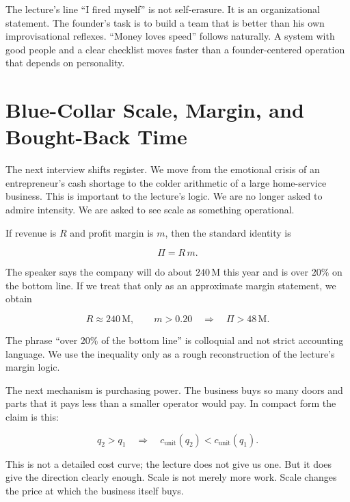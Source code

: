 The lecture's line ``I fired myself'' is not self-erasure. It is an organizational statement. The founder's task is to build a team that is better than his own improvisational reflexes. ``Money loves speed'' follows naturally. A system with good people and a clear checklist moves faster than a founder-centered operation that depends on personality.

\section{Blue-Collar Scale, Margin, and Bought-Back Time}

The next interview shifts register. We move from the emotional crisis of an entrepreneur's cash shortage to the colder arithmetic of a large home-service business. This is important to the lecture's logic. We are no longer asked to admire intensity. We are asked to see scale as something operational.

If revenue is \(R\) and profit margin is \(m\), then the standard identity is

\begin{equation}
\Pi = R\,m.
\end{equation}

The speaker says the company will do about \(240\,\text{M}\) this year and is over \(20\%\) on the bottom line. If we treat that only as an approximate margin statement, we obtain

\begin{equation}
R \approx 240\,\text{M}, \qquad m > 0.20
\quad \Longrightarrow \quad
\Pi > 48\,\text{M}.
\end{equation}

\begin{remark}
The phrase ``over \(20\%\) of the bottom line'' is colloquial and not strict accounting language. We use the inequality only as a rough reconstruction of the lecture's margin logic.
\end{remark}

The next mechanism is purchasing power. The business buys so many doors and parts that it pays less than a smaller operator would pay. In compact form the claim is this:

\begin{equation}
q_2 > q_1 \quad \Longrightarrow \quad c_{\text{unit}}(q_2) < c_{\text{unit}}(q_1).
\end{equation}

This is not a detailed cost curve; the lecture does not give us one. But it does give the direction clearly enough. Scale is not merely more work. Scale changes the price at which the business itself buys.

